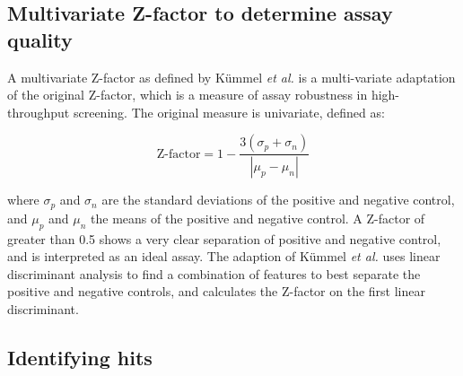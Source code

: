 \documentclass[a4paper,11pt,twoside,openright]{scrbook}
\begin{document}
\subsection{Multivariate Z-factor to determine assay quality}
A multivariate Z-factor as defined by Kümmel \textit{et al.}\cite{Kummel2010} is a multi-variate adaptation of the 
original Z-factor, \cite{Zhang1999} which is a measure of assay robustness in high-throughput screening.
The original measure is univariate, defined as:

\begin{equation}
    \text{Z-factor} = 1 - \frac{3(\sigma_p + \sigma_n)}
                               {|\mu_p - \mu_n|}
\end{equation}

where $\sigma_p$ and $\sigma_n$ are the standard deviations of the positive and negative control, and $\mu_p$ and 
$\mu_n$ the means of the positive and negative control.
A Z-factor of greater than 0.5 shows a very clear separation of positive and negative control, and is interpreted as an 
ideal assay.
The adaption of Kümmel \textit{et al.} uses linear discriminant analysis to find a combination of features to best 
separate the positive and negative controls, and calculates the Z-factor on the first linear discriminant.


\subsection{Identifying hits}
\end{document}
